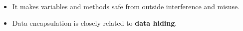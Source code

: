 \begin{flushleft}
\begin{itemize}
		
		\item It makes variables and methods safe from outside interference and misuse.
	
		\item Data encapsulation is closely related to \textbf{data hiding}.
			
	\end{itemize}	
	
\end{flushleft}
